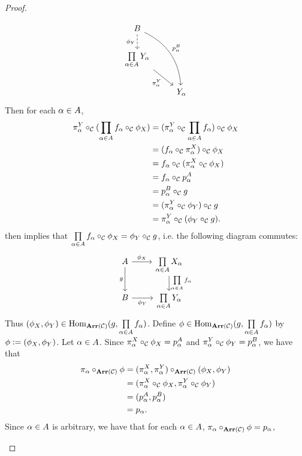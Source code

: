 \documentclass{book}
\begin{document}
\begin{proof}
\begin{itemize}
\[\begin{tikzcd}[baseline= 7]
				B   \arrow[d, "\phi_Y"', dashed]  \arrow[ddr, "p^B_{\al}"', bend left=30, swap]    &  \\
				\prod\limits_{\al \in A} Y_{\al} \arrow[dr, "\pi^Y_{\al}"']                        & \\
				& Y_{\al}   
			\end{tikzcd}
			\]
			Then for each $\alpha \in A$,
			\begin{align*}
				\pi^Y_{\alpha} \circ_{\mathcal{C}} (\prod\limits_{\alpha \in A} f_{\alpha} \circ_{\mathcal{C}} \phi_X)
				& = (\pi^Y_{\alpha} \circ_{\mathcal{C}} \prod\limits_{\alpha \in A} f_{\alpha}) \circ_{\mathcal{C}} \phi_X \\
				& = (f_{\alpha} \circ_{\mathcal{C}} \pi^X_{\alpha}) \circ_{\mathcal{C}} \phi_X \\
				& = f_{\alpha} \circ_{\mathcal{C}} (\pi^X_{\alpha} \circ_{\mathcal{C}} \phi_X) \\
				& = f_{\alpha} \circ_{\mathcal{C}} p^A_{\alpha} \\
				& = p^B_{\alpha} \circ_{\mathcal{C}} g \\
				& = (\pi^Y_{\alpha} \circ_{\mathcal{C}} \phi_Y) \circ_{\mathcal{C}} g \\
				& = \pi^Y_{\alpha} \circ_{\mathcal{C}} (\phi_Y \circ_{\mathcal{C}} g).
			\end{align*}
			 then implies that $\prod\limits_{\alpha \in A} f_{\alpha} \circ_{\mathcal{C}} \phi_X = \phi_Y \circ_{\mathcal{C}} g$, i.e. the following diagram commutes: 
			\[
			\begin{tikzcd}[baseline= 7]
				A  \arrow[r, "\phi_X"]  \arrow[d, "g"']  & \prod\limits_{\al \in A} X_{\al}   \arrow[d, "\prod\limits_{\al \in A} f_{\al}"]\\
				B \arrow[r, "\phi_Y"'] &  \prod\limits_{\al \in A} Y_{\al}
			\end{tikzcd}
			\]
			Thus $(\phi_X, \phi_Y) \in \operatorname{Hom}_{\operatorname{\textbf{Arr}}(\mathcal{C})}(g, \prod\limits_{\alpha \in A} f_{\alpha})$. Define $\phi \in \operatorname{Hom}_{\operatorname{\textbf{Arr}}(\mathcal{C})}(g, \prod\limits_{\alpha \in A} f_{\alpha})$ by $\phi \vcentcolon= (\phi_X, \phi_Y)$. Let $\alpha \in A$. Since 
			$\pi^X_{\alpha} \circ_{\mathcal{C}} \phi_X = p^A_{\alpha}$ and $\pi^Y_{\alpha} \circ_{\mathcal{C}} \phi_Y = p^B_{\alpha}$, we have that 
			\begin{align*}
				\pi_{\alpha} \circ_{\operatorname{\textbf{Arr}}(\mathcal{C})} \phi
				& = (\pi^X_{\alpha}, \pi^Y_{\alpha}) \circ_{\operatorname{\textbf{Arr}}(\mathcal{C})}  (\phi_X, \phi_Y) \\
				& = (\pi^X_{\alpha} \circ_{\mathcal{C}} \phi_X, \pi^Y_{\alpha} \circ_{\mathcal{C}} \phi_Y) \\
				& = (p^A_{\alpha}, p^B_{\alpha}) \\
				& = p_{\alpha}.
			\end{align*}
			Since $\alpha \in A$ is arbitrary, we have that for each $\alpha \in A$, $\pi_{\alpha} \circ_{\operatorname{\textbf{Arr}}(\mathcal{C})} \phi = p_{\alpha}$,

\end{itemize}
\end{proof}
\end{document}
